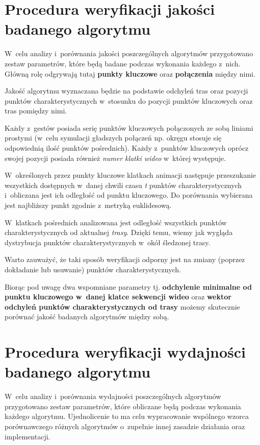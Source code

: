   \section{Procedura weryfikacji jakości badanego algorytmu}\label{Section_Jakosc}

    W~celu analizy i~porównania jakości poszczególnych algorytmów przygotowano zestaw parametrów, które będą badane podczas wykonania każdego z~nich. Główną rolę odgrywają tutaj \textbf{punkty kluczowe} oraz \textbf{połączenia} między nimi.

    Jakość algorytmu wyznaczana będzie na podstawie odchyleń tras oraz pozycji punktów charakterystycznych w~stosunku do pozycji punktów kluczowych oraz tras pomiędzy nimi.

    Każdy z~gestów posiada serię punktów kluczowych połączonych ze sobą liniami prostymi (w~celu symulacji gładszych połączeń np. okręgu stosuje się odpowiednią ilość punktów pośrednich). Każdy z~punktów kluczowych oprócz swojej pozycji posiada również \textit{numer klatki wideo} w~której występuje.

    W~określonych przez punkty kluczowe klatkach animacji następuje przeszukanie wszystkich dostępnych w~danej chwili czasu \textit{t} punktów charakterystycznych i~obliczana jest ich odległość od punktu kluczowego. Do porównania wybierana jest najbliższy punkt zgodnie z~metryką euklidesową.

    W~klatkach pośrednich analizowana jest odległość wszystkich punktów charakterystycznych od aktualnej \textit{trasy}. Dzięki temu, wiemy jak wygląda dystrybucja punktów charakterystycznych w~okół śledzonej trasy.

    Warto zauważyć, że taki sposób weryfikacji odporny jest na zmiany (poprzez dokładanie lub usuwanie) punktów charakterystycznych.

    Biorąc pod uwagę dwa wspomniane parametry tj. \textbf{odchylenie minimalne od punktu kluczowego w~danej klatce sekwencji wideo} oraz \textbf{wektor odchyleń punktów charakterystycznych od trasy} możemy skutecznie porównać jakość badanych algorytmów między sobą.

  \section{Procedura weryfikacji wydajności badanego algorytmu}\label{Section_Wydajnosc}

    W~celu analizy i~porównania wydajności poszczególnych algorytmów przygotowano zestaw parametrów, które obliczane będą podczas wykonania każdego algorytmu. Ujednolicenie to ma celu wypracowanie wspólnego wzorca porównawczego różnych algorytmów o~zupełnie innej zasadzie działania oraz implementacji.

